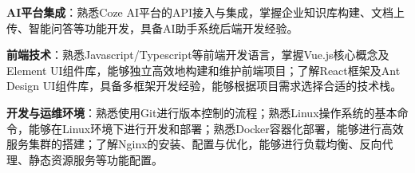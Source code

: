 \item \textbf{AI平台集成}：熟悉Coze AI平台的API接入与集成，掌握企业知识库构建、文档上传、智能问答等功能开发，具备AI助手系统后端开发经验。
\item \textbf{前端技术}：熟悉Javascript/Typescript等前端开发语言，掌握Vue.js核心概念及Element UI组件库，能够独立高效地构建和维护前端项目；了解React框架及Ant Design UI组件库，具备多框架开发经验，能够根据项目需求选择合适的技术栈。
\item \textbf{开发与运维环境}：熟悉使用Git进行版本控制的流程；熟悉Linux操作系统的基本命令，能够在Linux环境下进行开发和部署；熟悉Docker容器化部署，能够进行高效服务集群的搭建；了解Nginx的安装、配置与优化，能够进行负载均衡、反向代理、静态资源服务等功能配置。